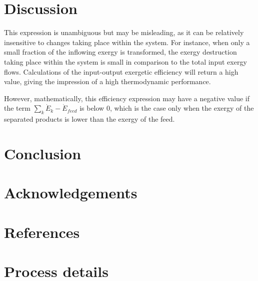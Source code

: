 \documentclass[times,3p]{elsarticle}
\begin{document}
\section{Discussion}
\label{sec:discussion}

This expression is unambiguous but may be misleading, as it can be relatively insensitive to changes taking place within the system. For instance, when only a small fraction of the inflowing exergy is transformed, the exergy destruction taking place within the system is small in comparison to the total input exergy flows. Calculations of the input-output exergetic efficiency will return a high value, giving the impression of a high thermodynamic performance.

However, mathematically, this efficiency expression may have a negative value if the term $\sum_k\dot{E}_k-\dot{E}_{feed}$ is below 0, which is the case only when the exergy of the separated products is lower than the exergy of the feed. 

\section{Conclusion}
\label{sec:conclusion}
			

\section*{Acknowledgements}


\section*{References}
\label{References}



			


\appendix 

\section{Process details}
\end{document}
